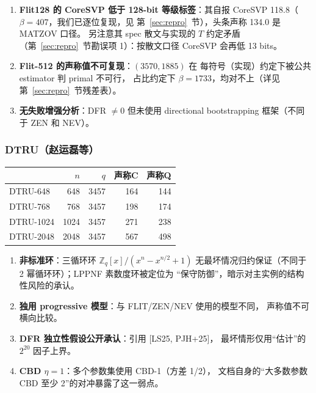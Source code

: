 \documentclass[11pt,a4paper]{ctexart}
\begin{document}
\begin{gapbox}
\begin{enumerate}
\item \textbf{Flit128 的 CoreSVP 低于 128-bit 等级标签}：其自报
      CoreSVP 118.8（$\beta{=}407$，我们已逐位复现，见
      第~\ref{sec:repro}~节），头条声称 134.0 是 MATZOV 口径。
      另注意其 spec 散文与实现的 $T$ 约定矛盾
      （第~\ref{sec:repro}~节勘误项 1）：按散文口径 CoreSVP
      会再低 13 bits。
\item \textbf{Flit-512 的声称值不可复现}：$(3570, 1885)$ 在
      每符号（实现）约定下被公共 estimator 判 primal 不可行，
      占比约定下 $\beta{=}1733$，均对不上（详见
      第~\ref{sec:repro}~节残差表）。
\item \textbf{无失败增强分析}：DFR $\ne 0$ 但未使用 directional
      bootstrapping 框架（不同于 ZEN 和 NEV）。
\end{enumerate}
\end{gapbox}

\subsubsection{DTRU（赵运磊等）}

\begin{table}[htbp]\centering\small
\begin{tabular}{@{}lrrrr@{}}
\toprule
 & $n$ & $q$ & 声称C & 声称Q \\
\midrule
DTRU-648 & 648 & 3457 & 164 & 144 \\
DTRU-768 & 768 & 3457 & 198 & 174 \\
DTRU-1024 & 1024 & 3457 & 271 & 238 \\
DTRU-2048 & 2048 & 3457 & 567 & 498 \\
\bottomrule
\end{tabular}
\end{table}

\begin{gapbox}
\begin{enumerate}
\item \textbf{非标准环}：三循环环 $\mathbb{Z}_q[x]/(x^n - x^{n/2} + 1)$
      无最坏情况归约保证（不同于 2 幂循环环）；LPPNF 素数度环被定位为
      ``保守防御''，暗示对主实例的结构性风险的承认。
\item \textbf{独用 progressive 模型}：与 FLIT/ZEN/NEV 使用的模型不同，
      声称值不可横向比较。
\item \textbf{DFR 独立性假设公开承认}：引用 [LS25, PJH+25]，
      最坏情形仅用``估计''的 $2^{20}$ 因子上界。
\item \textbf{CBD $\eta=1$}：多个参数集使用 CBD-1（方差 1/2），
      文档自身的``大多数参数 CBD 至少 2''的对冲暴露了这一弱点。
\end{enumerate}
\end{gapbox}
\end{document}
